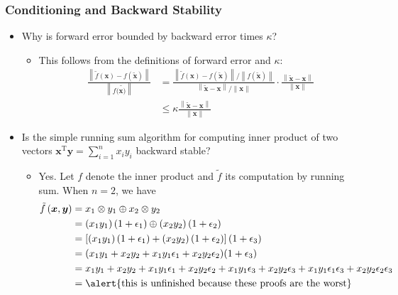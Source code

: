 \documentclass[10pt]{beamer}
\newcommand{\norm}[1]{\left\lVert#1\right\rVert}
\renewcommand{\vec}[1]{\boldsymbol{#1}}
\newcommand{\T}{\mathrm{T}}
\newcommand{\perturb}[1]{\tilde{#1}}
\newcommand{\subitem}[1]{\begin{itemize}\item #1\end{itemize}}
\begin{document}
\begin{frame}
  \frametitle{Conditioning and Backward Stability}
  \begin{itemize}[<+->]
    \item Why is forward error bounded by backward error times \(\kappa\)?
  \subitem{This follows from the definitions of forward error and \(\kappa\): \begin{align*}\frac{\norm{\perturb{f}(\vec{x}) - f(\perturb{\vec{x}})}}{\norm{f(\perturb{\vec{x})}}} &= \frac{\norm{\perturb{f}(\vec{x}) - f(\perturb{\vec{x}})}/\norm{f(\perturb{\vec{x}})}}{\norm{\perturb{\vec{x}} - \vec{x}}/\norm{\vec{x}}}\cdot \frac{\norm{\perturb{\vec{x}} - \vec{x}}}{\norm{\vec{x}}}\\&\leq \kappa \frac{\norm{\perturb{\vec{x}} - \vec{x}}}{\norm{\vec{x}}}\end{align*}\vspace{-4mm}}
    \item Is the simple running sum algorithm for computing inner product of two vectors \(\vec{x}^{\T}\vec{y} = \sum_{i=1}^n x_i y_i\) backward stable?
  \subitem{Yes. Let \(f\) denote the inner product and \(\perturb{f}\) its computation by running sum. When \(n = 2\), we have 
  \begin{align*}\perturb{f}\left(\vec{x}, \vec{y}\right)
    &= x_1 \otimes y_1 \oplus x_2 \otimes y_2\\
    &= \left(x_1y_1\right)\left(1 + \epsilon_1\right) \oplus \left(x_2y_2\right)\left(1 + \epsilon_2\right)\\
    &= \left[\left(x_1y_1\right)\left(1 + \epsilon_1\right) + \left(x_2y_2\right)\left(1 + \epsilon_2\right)\right](1 + \epsilon_3)\\
    &= (x_1y_1 + x_2y_2 + x_1y_1\epsilon_1 + x_2y_2\epsilon_2)(1 + \epsilon_3)\\
    &= x_1y_1 + x_2y_2 + x_1y_1\epsilon_1 + x_2y_2\epsilon_2 + x_1y_1\epsilon_3 + x_2y_2\epsilon_3 + x_1y_1\epsilon_1\epsilon_3 + x_2y_2\epsilon_2\epsilon_3\\
    &= \alert{\text{this is unfinished because these proofs are the worst}}
  \end{align*}}
  \end{itemize}
\end{frame}
\end{document}
